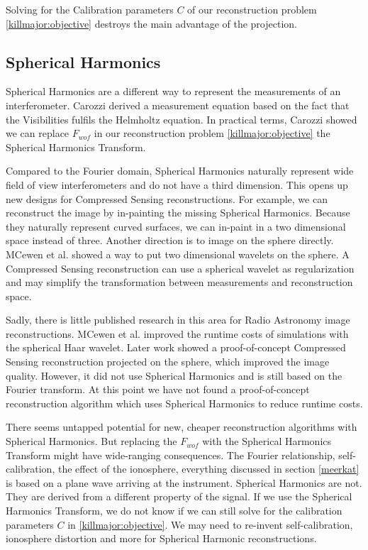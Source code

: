 Solving for the Calibration parameters $C$ of our reconstruction problem \eqref{killmajor:objective} destroys the main advantage of the projection. 


\subsection{Spherical Harmonics}
Spherical Harmonics are a different way to represent the measurements of an interferometer. Carozzi\cite{carozzi2015imaging} derived a measurement equation based on the fact that the Visibilities fulfils the Helmholtz equation. In practical terms, Carozzi showed we can replace $F_{wof}$ in our reconstruction problem \eqref{killmajor:objective} the Spherical Harmonics Transform. 

Compared to the Fourier domain, Spherical Harmonics naturally represent wide field of view interferometers and do not have a third dimension. This opens up new designs for Compressed Sensing reconstructions. For example, we can reconstruct the image by in-painting the missing Spherical Harmonics. Because they naturally represent curved surfaces, we can in-paint in a two dimensional space instead of three. Another direction is to image on the sphere directly. MCewen et al.\cite{mcewen2008simulating} showed a way to put two dimensional wavelets on the sphere. A Compressed Sensing reconstruction can use a spherical wavelet as regularization and may simplify the transformation between measurements and reconstruction space.

Sadly, there is little published research in this area for Radio Astronomy image reconstructions. MCewen et al.\cite{mcewen2008simulating} improved the runtime costs of simulations with the spherical Haar wavelet. Later work\cite{mcewen2011compressed} showed a proof-of-concept Compressed Sensing reconstruction projected on the sphere, which improved the image quality. However, it did not use Spherical Harmonics and \cite{mcewen2011compressed} is still based on the Fourier transform. At this point we have not found a proof-of-concept reconstruction algorithm which uses Spherical Harmonics to reduce runtime costs. 

There seems untapped potential for new, cheaper reconstruction algorithms with Spherical Harmonics. But replacing the $F_{wof}$ with the Spherical Harmonics Transform might have wide-ranging consequences. The Fourier relationship, self-calibration, the effect of the ionosphere, everything discussed in section \ref{meerkat} is based on a plane wave arriving at the instrument\cite{thompson1986interferometry, smirnov2011revisiting}. Spherical Harmonics are not. They are derived from a different property of the signal. If we use the Spherical Harmonics Transform, we do not know if we can still solve for the calibration parameters $C$ in \eqref{killmajor:objective}. We may need to re-invent self-calibration, ionosphere distortion and more for Spherical Harmonic reconstructions.


